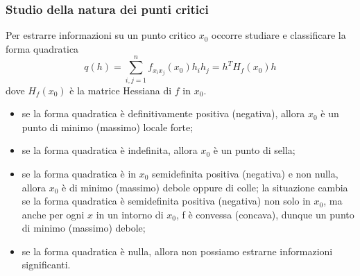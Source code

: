 \subsubsection{Studio della natura dei punti critici}
Per estrarre informazioni su un punto critico $x_0$ occorre studiare e classificare la forma quadratica 
\[
    q(h) = \sum_{i,j=1}^{n}f_{x_ix_j}(x_0)h_ih_j = h^TH_f(x_0)h
\]
dove $H_f(x_0)$ è la matrice Hessiana di $f$ in $x_0$.\newline
\begin{tcolorbox}
\begin{itemize}
    \item se la forma quadratica è definitivamente positiva (negativa), allora $x_0$ è un punto di minimo (massimo) locale forte;
    \item se la forma quadratica è indefinita, allora $x_0$ è un punto di sella;
    \item se la forma quadratica è in $x_0$ semidefinita positiva (negativa) e non nulla, allora $x_0$ è di minimo (massimo) debole oppure di colle; la situazione cambia se la forma quadratica è semidefinita positiva (negativa) non solo in $x_0$, ma anche per ogni $x$ in un intorno di $x_0$, f è convessa (concava), dunque un punto di minimo (massimo) debole;
    \item se la forma quadratica è nulla, allora non possiamo estrarne informazioni significanti.
\end{itemize}
\end{tcolorbox}
